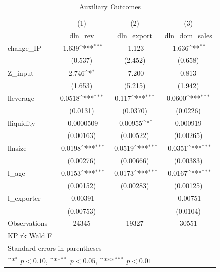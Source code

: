 \begin{table}[htbp]\centering
\def\sym#1{\ifmmode^{#1}\else\(^{#1}\)\fi}
\caption{Auxiliary Outcomes}
\begin{tabular}{l*{3}{c}}
\hline\hline
            &\multicolumn{1}{c}{(1)}&\multicolumn{1}{c}{(2)}&\multicolumn{1}{c}{(3)}\\
            &\multicolumn{1}{c}{dln\_rev}&\multicolumn{1}{c}{dln\_export}&\multicolumn{1}{c}{dln\_dom\_sales}\\
\hline
change\_IP   &      -1.639\sym{***}&      -1.123         &      -1.636\sym{**} \\
            &     (0.537)         &     (2.452)         &     (0.658)         \\
[1em]
Z\_input     &       2.746\sym{*}  &      -7.200         &       0.813         \\
            &     (1.653)         &     (5.215)         &     (1.942)         \\
[1em]
lleverage   &      0.0518\sym{***}&       0.117\sym{***}&      0.0600\sym{***}\\
            &    (0.0131)         &    (0.0370)         &    (0.0226)         \\
[1em]
lliquidity  &  -0.0000509         &    -0.00955\sym{*}  &    0.000919         \\
            &   (0.00163)         &   (0.00522)         &   (0.00265)         \\
[1em]
llnsize     &     -0.0198\sym{***}&     -0.0519\sym{***}&     -0.0351\sym{***}\\
            &   (0.00276)         &   (0.00666)         &   (0.00383)         \\
[1em]
l\_age       &     -0.0153\sym{***}&     -0.0173\sym{***}&     -0.0167\sym{***}\\
            &   (0.00152)         &   (0.00283)         &   (0.00125)         \\
[1em]
l\_exporter  &    -0.00391         &                     &    -0.00751         \\
            &   (0.00753)         &                     &    (0.0104)         \\
\hline
Observations&       24345         &       19327         &       30551         \\
KP rk Wald F&                     &                     &                     \\
\hline\hline
\multicolumn{4}{l}{\footnotesize Standard errors in parentheses}\\
\multicolumn{4}{l}{\footnotesize \sym{*} \(p<0.10\), \sym{**} \(p<0.05\), \sym{***} \(p<0.01\)}\\
\end{tabular}
\end{table}
